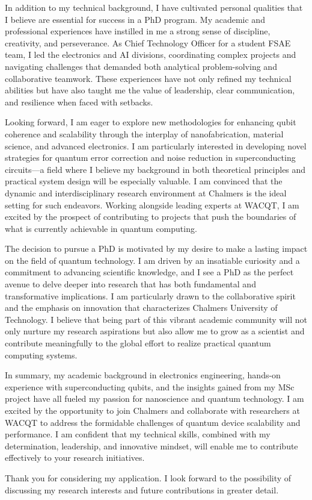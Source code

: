 \documentclass[10pt,stdletter,dateno]{newlfm}
\begin{document}
\begin{newlfm}
        In addition to my technical background, I have cultivated personal qualities that I believe are essential for success in a PhD program. My academic and professional experiences have instilled in me a strong sense of discipline, creativity, and perseverance. As Chief Technology Officer for a student FSAE team, I led the electronics and AI divisions, coordinating complex projects and navigating challenges that demanded both analytical problem-solving and collaborative teamwork. These experiences have not only refined my technical abilities but have also taught me the value of leadership, clear communication, and resilience when faced with setbacks.
        
        Looking forward, I am eager to explore new methodologies for enhancing qubit coherence and scalability through the interplay of nanofabrication, material science, and advanced electronics. I am particularly interested in developing novel strategies for quantum error correction and noise reduction in superconducting circuits—a field where I believe my background in both theoretical principles and practical system design will be especially valuable. I am convinced that the dynamic and interdisciplinary research environment at Chalmers is the ideal setting for such endeavors. Working alongside leading experts at WACQT, I am excited by the prospect of contributing to projects that push the boundaries of what is currently achievable in quantum computing.
        
        The decision to pursue a PhD is motivated by my desire to make a lasting impact on the field of quantum technology. I am driven by an insatiable curiosity and a commitment to advancing scientific knowledge, and I see a PhD as the perfect avenue to delve deeper into research that has both fundamental and transformative implications. I am particularly drawn to the collaborative spirit and the emphasis on innovation that characterizes Chalmers University of Technology. I believe that being part of this vibrant academic community will not only nurture my research aspirations but also allow me to grow as a scientist and contribute meaningfully to the global effort to realize practical quantum computing systems.
        
        In summary, my academic background in electronics engineering, hands-on experience with superconducting qubits, and the insights gained from my MSc project have all fueled my passion for nanoscience and quantum technology. I am excited by the opportunity to join Chalmers and collaborate with researchers at WACQT to address the formidable challenges of quantum device scalability and performance. I am confident that my technical skills, combined with my determination, leadership, and innovative mindset, will enable me to contribute effectively to your research initiatives.
        
        Thank you for considering my application. I look forward to the possibility of discussing my research interests and future contributions in greater detail.
        
    \end{newlfm}
\end{document}
